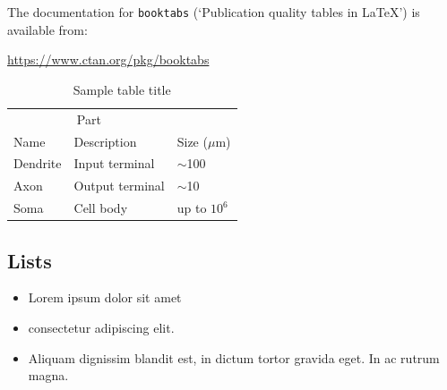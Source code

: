 \documentclass{article}
\begin{document}
The documentation for \verb+booktabs+ (`Publication quality tables in LaTeX') is available from:
\begin{center}
	\url{https://www.ctan.org/pkg/booktabs}
\end{center}


\begin{table}
	\caption{Sample table title}
	\centering
	\begin{tabular}{lll}
		\toprule
		\multicolumn{2}{c}{Part}                   \\
		\cmidrule(r){1-2}
		Name     & Description     & Size ($\mu$m) \\
		\midrule
		Dendrite & Input terminal  & $\sim$100     \\
		Axon     & Output terminal & $\sim$10      \\
		Soma     & Cell body       & up to $10^6$  \\
		\bottomrule
	\end{tabular}
	\label{tab:table}
\end{table}

\subsection{Lists}
\begin{itemize}
	\item Lorem ipsum dolor sit amet
	\item consectetur adipiscing elit.
	\item Aliquam dignissim blandit est, in dictum tortor gravida eget. In ac rutrum magna.
\end{itemize}




\end{document}
